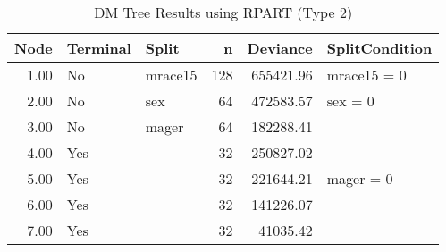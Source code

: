 \begin{table}[htbp]
\centering
\begingroup\footnotesize
\begin{tabular}{rllrrl}
  \setlength{\tabcolsep}{3pt}
 \hline
Node & Terminal & Split & n & Deviance & SplitCondition \\ 
  \hline
1.00 & No & mrace15 & 128 & 655421.96 & mrace15 = 0 \\ 
  2.00 & No & sex &  64 & 472583.57 & sex = 0 \\ 
  3.00 & No & mager &  64 & 182288.41 &  \\ 
  4.00 & Yes &  &  32 & 250827.02 &  \\ 
  5.00 & Yes &  &  32 & 221644.21 & mager = 0 \\ 
  6.00 & Yes &  &  32 & 141226.07 &  \\ 
  7.00 & Yes &  &  32 & 41035.42 &  \\ 
   \hline
\end{tabular}
\endgroup
\caption{DM Tree Results using RPART (Type 2)} 
\label{tab:rpart_results_type2}
\end{table}
